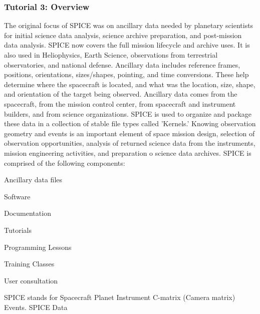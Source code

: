 \documentclass[crop=false,class=article,oneside]{standalone}
\begin{document}
        \subsubsection{Tutorial 3: Overview}
            The original focus of SPICE was on ancillary data
            needed by planetary scientists for initial science
            data analysis, science archive preparation, and
            post-mission data analysis. SPICE now covers the
            full mission lifecycle and archive uses. It is also
            used in Heliophysics, Earth Science, observations
            from terrestrial observatories, and national defense.
            Ancillary data includes reference frames, positions,
            orientations, sizes/shapes, pointing, and time
            conversions. These help determine where the
            spacecraft is located, and what was the location,
            size, shape, and orientation of the target being
            observed. Ancillary data comes from the spacecraft,
            from the mission control center, from spacecraft and
            instrument builders, and from science organizations.
            SPICE is used to organize and package these data in
            a collection of stable file types called 'Kernels.'
            Knowing observation geometry and events is an
            important element of space mission design, selection
            of observation opportunities, analysis of returned
            science data from the instruments, mission
            engineering activities, and preparation o science
            data archives. SPICE is comprised of the following
            components:
            \begin{enumerate}
                \begin{multicols}{3}
                    \item Ancillary data files
                    \item Software
                    \item Documentation
                    \item Tutorials
                    \item Programming Lessons
                    \item Training Classes
                    \item User consultation
                \end{multicols}
            \end{enumerate}
            SPICE stands for Spacecraft Planet Instrument
            C-matrix (Camera matrix) Events. SPICE Data
\end{document}
